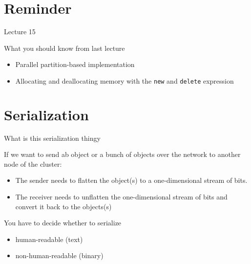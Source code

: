 \documentclass[\classoption]{beamer}
\title{\coursename}
\subtitle{Lecture 16: Preparation for distributed computing }
\author{\tiny Patrick Diehl \orcid{0000-0003-3922-8419}}
\date {
 \tiny \url{\courseurl}
\vspace{2cm}
\doclicenseThis  
  
}
\begin{document}
 {
    \frame {
        \titlepage
    }
}

\frame{

\tableofcontents

}


\section{Reminder}
\begin{frame}{Lecture 15}
\begin{block}{What you should know from last lecture}
\begin{itemize}
\item Parallel partition-based implementation
\item Allocating and deallocating memory with the \lstinline|new| and \lstinline|delete| expression
\end{itemize}
\end{block}
\end{frame}

\section{Serialization}

\begin{frame}{What is this serialization thingy}

If we want to send ab object or a bunch of objects over the network to another node of the cluster:

\begin{itemize}
\item The sender needs to flatten the object(s) to a one-dimensional stream of bits.
\item The receiver needs to unflatten the one-dimensional stream of bits and convert it back to the objects(s)
\end{itemize}

You have to decide whether to serialize
\begin{itemize}
\item human-readable (text)
\item non-human-readable (binary)
\end{itemize}
\end{frame}
\end{document}

